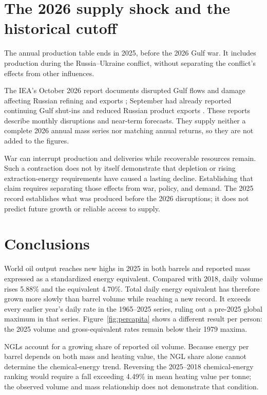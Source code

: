 \documentclass[reprint,aps,pra,longbibliography,floatfix]{revtex4-2}
\begin{document}
\section{The 2026 supply shock and the historical cutoff}
The annual production table ends in 2025, before the 2026 Gulf war. It includes production during the Russia--Ukraine conflict, without separating the conflict's effects from other influences.

The IEA's October 2026 report documents disrupted Gulf flows and damage affecting Russian refining and exports \citep{ieaOctober2026}; September had already reported continuing Gulf shut-ins and reduced Russian product exports \citep{ieaSeptember2026}. These reports describe monthly disruptions and near-term forecasts. They supply neither a complete 2026 annual mass series nor matching annual returns, so they are not added to the figures.

War can interrupt production and deliveries while recoverable resources remain. Such a contraction does not by itself demonstrate that depletion or rising extraction-energy requirements have caused a lasting decline. Establishing that claim requires separating those effects from war, policy, and demand. The 2025 record establishes what was produced before the 2026 disruptions; it does not predict future growth or reliable access to supply.

\section{Conclusions}
World oil output reaches new highs in 2025 in both barrels and reported mass expressed as a standardized energy equivalent. Compared with 2018, daily volume rises 5.88\% and the equivalent 4.70\%. Total daily energy equivalent has therefore grown more slowly than barrel volume while reaching a new record. It exceeds every earlier year's daily rate in the 1965--2025 series, ruling out a pre-2025 global maximum in that series. Figure~\ref{fig:percapita} shows a different result per person: the 2025 volume and gross-equivalent rates remain below their 1979 maxima.

NGLs account for a growing share of reported oil volume. Because energy per barrel depends on both mass and heating value, the NGL share alone cannot determine the chemical-energy trend. Reversing the 2025--2018 chemical-energy ranking would require a fall exceeding 4.49\% in mean heating value per tonne; the observed volume and mass relationship does not demonstrate that condition.
\end{document}
